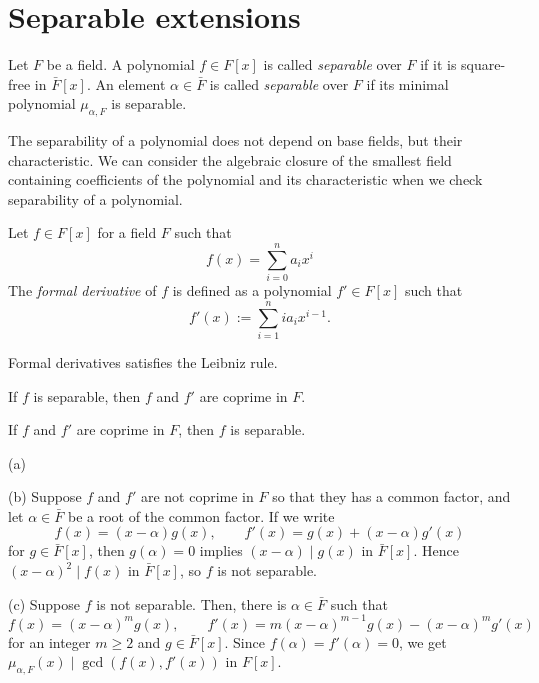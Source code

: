 \documentclass{../../large}
\begin{document}
\section{Separable extensions}


\begin{prb}
Let $F$ be a field.
A polynomial $f\in F[x]$ is called \emph{separable} over $F$ if it is square-free in $\bar F[x]$.
An element $\alpha\in\bar F$ is called \emph{separable} over $F$ if its minimal polynomial $\mu_{\alpha,F}$ is separable.
\end{prb}

The separability of a polynomial does not depend on base fields, but their characteristic.
We can consider the algebraic closure of the smallest field containing coefficients of the polynomial and its characteristic when we check separability of a polynomial.

\begin{prb}
Let $f\in F[x]$ for a field $F$ such that
\[f(x)=\sum_{i=0}^na_ix^i\]
The \emph{formal derivative} of $f$ is defined as a polynomial $f'\in F[x]$ such that
\[f'(x):=\sum_{i=1}^nia_ix^{i-1}.\]
\begin{parts}
\item Formal derivatives satisfies the Leibniz rule.
\item If $f$ is separable, then $f$ and $f'$ are coprime in $F$.
\item If $f$ and $f'$ are coprime in $F$, then $f$ is separable.
\end{parts}
\end{prb}
\begin{pf}
(a)

(b)
Suppose $f$ and $f'$ are not coprime in $F$ so that they has a common factor, and let $\alpha\in\bar F$ be a root of the common factor.
If we write
\[f(x)=(x-\alpha)g(x),\qquad f'(x)=g(x)+(x-\alpha)g'(x)\]
for $g\in\bar F[x]$, then $g(\alpha)=0$ implies $(x-\alpha)\mid g(x)$ in $\bar F[x]$.
Hence $(x-\alpha)^2\mid f(x)$ in $\bar F[x]$, so $f$ is not separable.

(c)
Suppose $f$ is not separable.
Then, there is $\alpha\in\bar F$ such that
\[f(x)=(x-\alpha)^mg(x),\qquad f'(x)=m(x-\alpha)^{m-1}g(x)-(x-\alpha)^mg'(x)\]
for an integer $m\ge2$ and $g\in\bar F[x]$.
Since $f(\alpha)=f'(\alpha)=0$, we get $\mu_{\alpha,F}(x)\mid\gcd(f(x),f'(x))$ in $F[x]$.
\end{pf}
\end{document}
